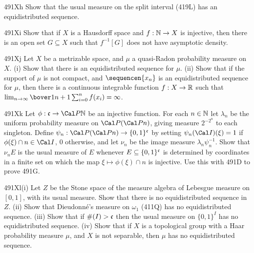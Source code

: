{\spheader 491Xh Show that the usual measure on the split interval
(419L) has an equidistributed sequence.

\sqheader 491Xi Show that if $X$ is a Hausdorff space and
$f:\Bbb N\to X$ is injective, then there is an open set
$G\subseteq X$ such that $f^{-1}[G]$ does not have asymptotic density.

\spheader 491Xj Let $X$ be a metrizable space, and $\mu$ a quasi-Radon
probability measure on $X$.   (i) Show that there is an
equidistributed
sequence for $\mu$.   (ii) Show that if the
support of $\mu$ is not compact, and $\sequencen{x_n}$ is an
equidistributed sequence for $\mu$, then there is a continuous
integrable function $f:X\to\Bbb R$ such that
$\lim_{n\to\infty}\bover1{n+1}\sum_{i=0}^nf(x_i)=\infty$.

\spheader 491Xk Let $\phi:\frak c\to\Cal P\Bbb N$ be an injective
function.   For each $n\in\Bbb N$ let $\lambda_n$ be the uniform
probability measure on $\Cal P(\Cal Pn)$, giving measure $2^{-2^n}$
to each singleton.
Define $\psi_n:\Cal P(\Cal Pn)\to\{0,1\}^{\frak c}$ by setting
$\psi_n(\Cal I)(\xi)=1$ if
$\phi(\xi)\cap n\in\Cal I$, $0$ otherwise, and let $\nu_n$ be the
image measure $\lambda_n\psi_n^{-1}$.   Show that $\nu_nE$ is the usual
measure of $E$ whenever
$E\subseteq\{0,1\}^{\frak c}$ is determined by coordinates in a finite
set on which the map $\xi\mapsto\phi(\xi)\cap n$ is injective.   Use
this with 491D to prove 491G.

\sqheader 491Xl(i) Let $Z$ be the Stone space of the measure algebra of
Lebesgue measure on $[0,1]$, with its usual measure.
Show that there is no equidistributed sequence in $Z$.   
(ii) Show that Dieudonn\'e's measure on $\omega_1$ (411Q) has no
equidistributed sequence.   (iii) Show that if $\#(I)>\frak c$ then the
usual measure on $\{0,1\}^I$ has no equidistributed sequence.   
(iv) Show that if $X$ is a topological group with a Haar probability
measure $\mu$, and $X$ is not separable, then $\mu$ has no
equidistributed sequence.   

}
